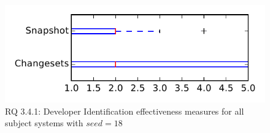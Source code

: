 
\begin{figure}
\centering
\includegraphics[height=0.4\textheight]{figures/dit_seed/rq1_tiny_18}
\caption{RQ 3.4.1: Developer Identification effectiveness measures for all subject systems with $seed=18$}
\label{fig:dit_seed:rq1:tiny}
\end{figure}
